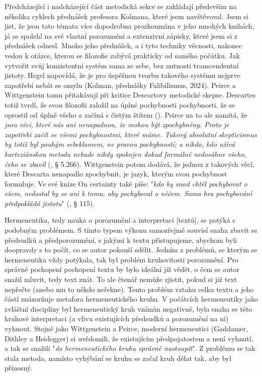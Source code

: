 \documentclass[11pt,a4paper]{article}
\begin{document}
Předcházející i nadcházející část metodická sekce se zakládají především na několika cyklech přednášek profesora Kolmana, které jsem navštěvoval. Jsem si jist, že jsou tato témata více dopodrobna prozkoumána v jeho mnohých knihách, já se spolehl na své vlastní porozumění a extenzivní zápisky, které jsem si z přednášek odnesl. Mnoho jeho přednášek, a i tyto techniky věcnosti, nakonec vedou k otázce, kterou se filozofie zabývá prakticky od samého počátku. Jak vytvořit svůj konzistentní systém sama ze sebe, bez nutnosti transcendentní jistoty. Hegel napovídá, že je pro úspěšnou tvorbu takového systému nejprve zapotřebí nebát se omylu (Kolman, přednášky Falibilismus, 2024). Peirce a Wittgenstein tomu přitakávají při kritice Descartovy metodické skepse. Descartes totiž tvrdí, že svou filozofii založil na úplné pochybnosti pochybnosti, že se oprostil od úplně všeho a začíná s čistým štítem (\cite{descartes_meditace_2004}). Peirce na to ale namítá, že \textit{jsou věci, které nás ani nenapadnou, že mohou být zpochybněny. Proto je zapotřebí začít se všemi pochybnostmi, které máme. Takový absolutní skepticismus by totiž byl pouhým sebeklamem, ne pravou pochybností; a nikdo, kdo užívá karteziánskou metodu nebude nikdy spokojen dokud formálně nedosáhne všeho, čeho se zbavil} (\cite{peirce_consequences_1991}, § 5.266). Wittgenstein potom dodává, že jednou z takových věcí, které Descarta nenapadlo zpochybnit, je jazyk, kterým svou pochybnost formuluje. Ve své knize On certainty také píše: "\textit{kdo by snad chtěl pochybovat o všem, nedostal by se ani k tomu, aby pochyboval o něčem. Sama hra pochybování předpokládá jistotu}" (\cite{wittgenstein_certainty_1969}, § 115).

Hermeneutika, tedy nauka o porozumění a interpretaci [textů], se potýká s podobným problémem. S tímto typem výkonu samozřejmě souvisí snaha zbavit se předsudků a předporozumění, s jakými k textu přistupujeme, abychom byli doopravdy s to počít, co se autor pokouší sdělit. Jedním z problémů, se kterým se hermeneutika vždy potýkala, tak byl problém kruhovitosti porozumění. Pro správné pochopení pochopení textu by bylo ideální již vědět, o čem se autor snažil mluvit, tedy text znát. To ale čtenář nemůže zjistit, pokud si již text nepřečte (anebo mu to někdo neřekne). Tento problém vztahu celku textu a jeho částí znázorňuje metafora hermeneutického kruhu. V počátcích hermeneutiky jako zvláštní disciplíny byl hermeneutický kruh vnímán negativně, byla snaha se této kruhové interpretaci (a vlivu existujících předsudků a porozumění na ni) vyhnout. Stejně jako Wittgenstein a Peirce, moderní hermeneutici (Gaddamer, Dithley a Heidegger) si uvědomili, že existujícím předpojatostem a není vyhnutí, a tak se snažili "\textit{do hermeneutického kruhu správně nastoupit}". Z problému se tak stala metoda, namísto vyhýbání se kruhu se začal kruh dělat tak, aby byl přínosný. 
\end{document}
